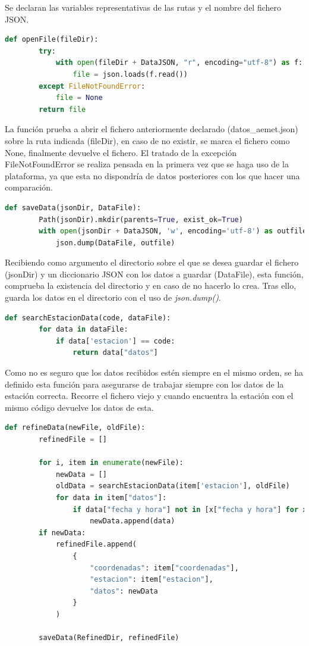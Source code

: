 Se declaran las variables representativas de las rutas y el nombre del fichero JSON.

\begin{lstlisting}[language=Python, caption={Declaración función openFile()}]
	def openFile(fileDir):
		try:
			with open(fileDir + DataJSON, "r", encoding="utf-8") as f:
				file = json.loads(f.read())
		except FileNotFoundError:
			file = None
		return file
\end{lstlisting}

La función prueba a abrir el fichero anteriormente declarado (datos\_aemet.json) sobre la ruta indicada (fileDir), en caso de no existir, se marca el fichero como None, finalmente devuelve el fichero. El tratado de la excepción FileNotFoundError se realiza pensada en la primera vez que se haga uso de la plataforma, ya que esta no dispondría de datos posteriores con los que hacer una comparación.

\begin{lstlisting}[language=Python, caption={Declaración función saveFile()}]
	def saveData(jsonDir, DataFile):
		Path(jsonDir).mkdir(parents=True, exist_ok=True)
		with open(jsonDir + DataJSON, 'w', encoding='utf-8') as outfile:
			json.dump(DataFile, outfile)
\end{lstlisting}

Recibiendo como argumento el directorio sobre el que se desea guardar el fichero (jsonDir) y un diccionario JSON con los datos a guardar (DataFile), esta función, comprueba la existencia del directorio y en caso de no hacerlo lo crea. Tras ello, guarda los datos en el directorio con el uso de \textit{json.dump()}.

\begin{lstlisting}[language=Python, caption={Declaración función searchEstacionData()}]
	def searchEstacionData(code, dataFile):
		for data in dataFile:
			if data['estacion'] == code:
				return data["datos"]
\end{lstlisting}

Como no es seguro que los datos recibidos estén siempre en el mismo orden, se ha definido esta función para asegurarse de trabajar siempre con los datos de la estación correcta. Recorre el fichero viejo y cuando encuentra la estación con el mismo código devuelve los datos de esta.

\begin{lstlisting}[language=Python, caption={Declaración función refinedData()}]
	def refineData(newFile, oldFile):
		refinedFile = []
		
		for i, item in enumerate(newFile):
			newData = []
			oldData = searchEstacionData(item['estacion'], oldFile)
			for data in item["datos"]:
				if data["fecha y hora"] not in [x["fecha y hora"] for x in oldData]:
					newData.append(data)
		if newData:
			refinedFile.append(
				{
					"coordenadas": item["coordenadas"],
					"estacion": item["estacion"],
					"datos": newData
				}
			)
		
		saveData(RefinedDir, refinedFile)
\end{lstlisting}

